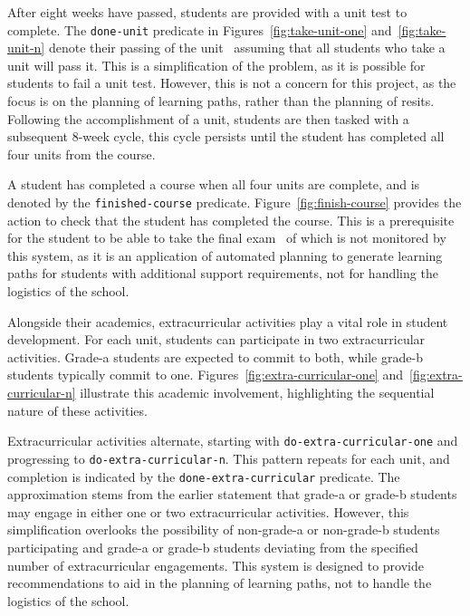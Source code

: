 After eight weeks have passed, students are provided with a unit test to complete. The \texttt{done-unit} predicate in Figures~\ref{fig:take-unit-one} and~\ref{fig:take-unit-n} denote their passing of the unit \textemdash~assuming that all students who take a unit will pass it. This is a simplification of the problem, as it is possible for students to fail a unit test. However, this is not a concern for this project, as the focus is on the planning of learning paths, rather than the planning of resits. Following the accomplishment of a unit, students are then tasked with a subsequent 8-week cycle, this cycle persists until the student has completed all four units from the course.




A student has completed a course when all four units are complete, and is denoted by the \texttt{finished-course} predicate. Figure~\ref{fig:finish-course} provides the action to check that the student has completed the course. This is a prerequisite for the student to be able to take the final exam \textemdash~of which is not monitored by this system, as it is an application of automated planning to generate learning paths for students with additional support requirements, not for handling the logistics of the school.



Alongside their academics, extracurricular activities play a vital role in student development. For each unit, students can participate in two extracurricular activities. Grade-a students are expected to commit to both, while grade-b students typically commit to one. Figures~\ref{fig:extra-curricular-one} and~\ref{fig:extra-curricular-n} illustrate this academic involvement, highlighting the sequential nature of these activities.




Extracurricular activities alternate, starting with \texttt{do-extra-curricular-one} and progressing to \texttt{do-extra-curricular-n}. This pattern repeats for each unit, and completion is indicated by the \texttt{done-extra-curricular} predicate. The approximation stems from the earlier statement that grade-a or grade-b students may engage in either one or two extracurricular activities. However, this simplification overlooks the possibility of non-grade-a or non-grade-b students participating and grade-a or grade-b students deviating from the specified number of extracurricular engagements. This system is designed to provide recommendations to aid in the planning of learning paths, not to handle the logistics of the school.

